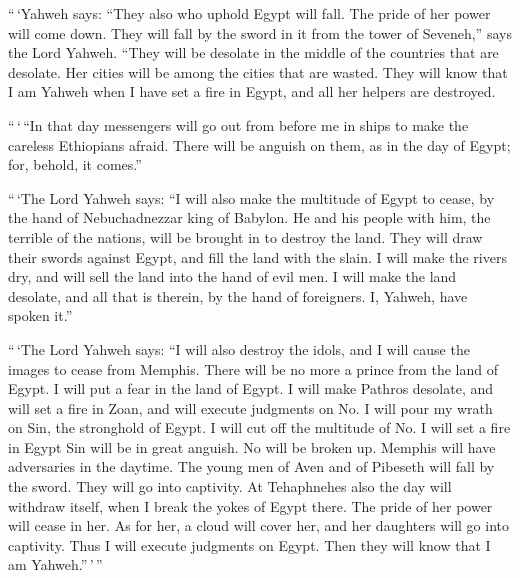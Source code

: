  ``\,`Yahweh says: ``They also who uphold Egypt will fall.
The pride of her power will come down. They will fall by the sword in it
from the tower of Seveneh,'' says the Lord Yahweh.  ``They
will be desolate in the middle of the countries that are desolate. Her
cities will be among the cities that are wasted.  They
will know that I am Yahweh when I have set a fire in Egypt, and all her
helpers are destroyed.

 ``\,`\,``In that day messengers will go out from before
me in ships to make the careless Ethiopians afraid. There will be
anguish on them, as in the day of Egypt; for, behold, it comes.''

 ``\,`The Lord Yahweh says: ``I will also make the
multitude of Egypt to cease, by the hand of Nebuchadnezzar king of
Babylon.  He and his people with him, the terrible of the
nations, will be brought in to destroy the land. They will draw their
swords against Egypt, and fill the land with the slain. 
I will make the rivers dry, and will sell the land into the hand of evil
men. I will make the land desolate, and all that is therein, by the hand
of foreigners. I, Yahweh, have spoken it.''

 ``\,`The Lord Yahweh says: ``I will also destroy the
idols, and I will cause the images to cease from Memphis. There will be
no more a prince from the land of Egypt. I will put a fear in the land
of Egypt.  I will make Pathros desolate, and will set a
fire in Zoan, and will execute judgments on No.  I will
pour my wrath on Sin, the stronghold of Egypt. I will cut off the
multitude of No.  I will set a fire in Egypt Sin will be
in great anguish. No will be broken up. Memphis will have adversaries in
the daytime.  The young men of Aven and of Pibeseth will
fall by the sword. They will go into captivity.  At
Tehaphnehes also the day will withdraw itself, when I break the yokes of
Egypt there. The pride of her power will cease in her. As for her, a
cloud will cover her, and her daughters will go into captivity.
 Thus I will execute judgments on Egypt. Then they will
know that I am Yahweh.''\,'\,''

